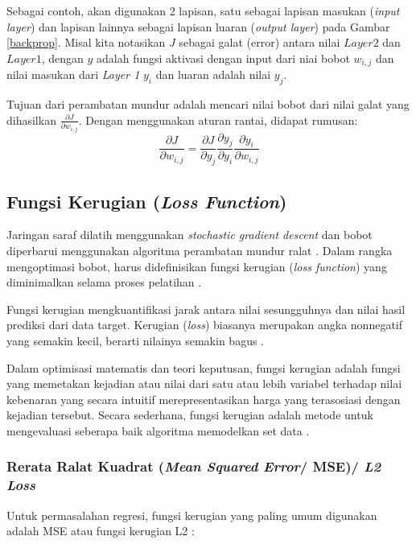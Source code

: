 Sebagai contoh, akan digunakan 2 lapisan, satu sebagai lapisan masukan (\emph{input layer}) dan lapisan lainnya sebagai lapisan luaran (\emph{output layer}) pada Gambar \ref{backprop}. Misal kita notasikan $J$ sebagai galat (error) antara nilai $Layer 2$ dan $Layer 1$, dengan $y$ adalah fungsi aktivasi dengan input dari niai bobot $w_{i,j}$ dan nilai masukan dari \emph{Layer 1} $y_i$ dan luaran adalah nilai $y_j$. 

Tujuan dari perambatan mundur adalah mencari nilai bobot dari nilai galat yang dihasilkan $\frac{\partial J}{\partial w_{i,j}}$. Dengan menggunakan aturan rantai, didapat rumusan:
\begin{equation}
    \frac{\partial J}{\partial w_{i,j}} = \frac{\partial J}{\partial y_j} \frac{\partial y_j}{\partial y_i} \frac{\partial y_i}{\partial w_{i,j}}
\end{equation}

\subsection{Fungsi Kerugian (\emph{Loss Function})}
Jaringan saraf dilatih menggunakan \emph{stochastic gradient descent} dan bobot diperbarui menggunakan algoritma perambatan mundur ralat \citep{brownlee_2019}. Dalam rangka mengoptimasi bobot, harus didefinisikan fungsi kerugian (\emph{loss function}) yang diminimalkan selama proses pelatihan \citep{szeliski_2011}. 

Fungsi kerugian mengkuantifikasi jarak antara nilai sesungguhnya dan nilai hasil prediksi dari data target. Kerugian (\emph{loss}) biasanya merupakan angka nonnegatif yang semakin kecil, berarti nilainya semakin bagus \citep{goodfellow_bengio_courville_2016}.

Dalam optimisasi matematis dan teori keputusan, fungsi kerugian adalah fungsi yang memetakan kejadian atau nilai dari satu atau lebih variabel terhadap nilai kebenaran yang secara intuitif merepresentasikan harga yang terasosiasi dengan kejadian tersebut. Secara sederhana, fungsi kerugian adalah metode untuk mengevaluasi seberapa baik algoritma memodelkan set data \citep{shankar_2022}.

\subsubsection{Rerata Ralat Kuadrat (\emph{Mean Squared Error}/ MSE)/ \emph{L2 Loss}}\label{mse}
Untuk permasalahan regresi, fungsi kerugian yang paling umum digunakan adalah MSE atau fungsi kerugian L2 \citep{szeliski_2011}:

